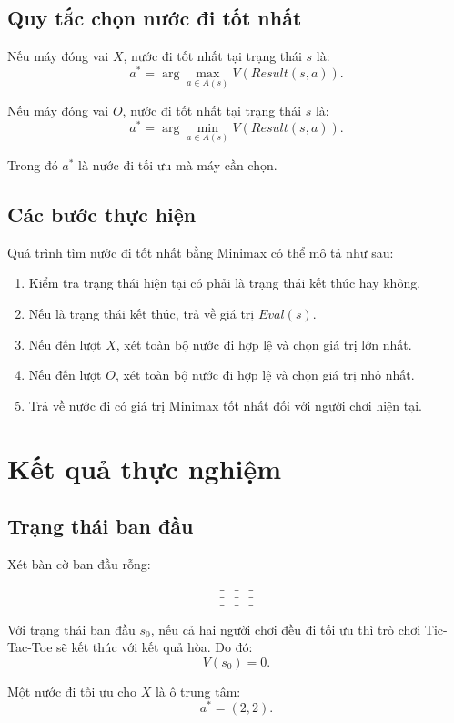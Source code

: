 \documentclass[12pt,a4paper]{article}
\newcommand{\blank}{\_}
\newcommand{\board}[9]{
\[
\begin{array}{c|c|c}
#1 & #2 & #3\\ \hline
#4 & #5 & #6\\ \hline
#7 & #8 & #9
\end{array}
\]
}
\begin{document}
\subsection{Quy tắc chọn nước đi tốt nhất}

Nếu máy đóng vai $X$, nước đi tốt nhất tại trạng thái $s$ là:
\[
a^*=\arg\max_{a \in A(s)} V(Result(s,a)).
\]

Nếu máy đóng vai $O$, nước đi tốt nhất tại trạng thái $s$ là:
\[
a^*=\arg\min_{a \in A(s)} V(Result(s,a)).
\]

Trong đó $a^*$ là nước đi tối ưu mà máy cần chọn.

\subsection{Các bước thực hiện}

Quá trình tìm nước đi tốt nhất bằng Minimax có thể mô tả như sau:
\begin{enumerate}[label=\textbf{Bước \arabic*:}]
    \item Kiểm tra trạng thái hiện tại có phải là trạng thái kết thúc hay không.
    \item Nếu là trạng thái kết thúc, trả về giá trị $Eval(s)$.
    \item Nếu đến lượt $X$, xét toàn bộ nước đi hợp lệ và chọn giá trị lớn nhất.
    \item Nếu đến lượt $O$, xét toàn bộ nước đi hợp lệ và chọn giá trị nhỏ nhất.
    \item Trả về nước đi có giá trị Minimax tốt nhất đối với người chơi hiện tại.
\end{enumerate}

\section{Kết quả thực nghiệm}

\subsection{Trạng thái ban đầu}

Xét bàn cờ ban đầu rỗng:
\board{\blank}{\blank}{\blank}{\blank}{\blank}{\blank}{\blank}{\blank}{\blank}

Với trạng thái ban đầu $s_0$, nếu cả hai người chơi đều đi tối ưu thì trò chơi Tic-Tac-Toe sẽ kết thúc với kết quả hòa.
Do đó:
\[
V(s_0)=0.
\]

Một nước đi tối ưu cho $X$ là ô trung tâm:
\[
a^*=(2,2).
\]
\end{document}
